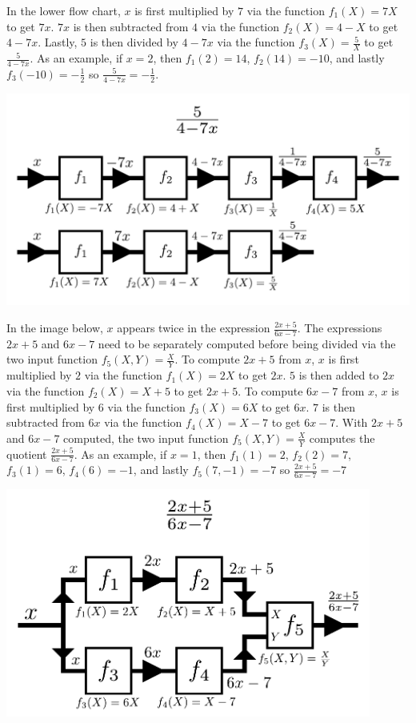 \documentclass{article}
\begin{document}
In the lower flow chart, \(x\) is first multiplied by \(7\) via the function \(f_1(X) = 7X\) to get \(7x\). \(7x\) is then subtracted from \(4\) via the function \(f_2(X) = 4 - X\) to get \(4 - 7x\). Lastly, \(5\) is then divided by \(4 - 7x\) via the function \(f_3(X) = \frac{5}{X}\) to get \(\frac{5}{4 - 7x}\). As an example, if \(x = 2\), then \(f_1(2) = 14\), \(f_2(14) = -10\), and lastly \(f_3(-10) = -\frac{1}{2}\) so \(\frac{5}{4 - 7x} = -\frac{1}{2}\). 

\includegraphics[width = \textwidth]{expressions_using_functions_1}

In the image below, \(x\) appears twice in the expression \(\frac{2x + 5}{6x - 7}\). The expressions \(2x + 5\) and \(6x - 7\) need to be separately computed before being divided via the two input function \(f_5(X, Y) = \frac{X}{Y}\). To compute \(2x + 5\) from \(x\), \(x\) is first multiplied by \(2\) via the function \(f_1(X) = 2X\) to get \(2x\). \(5\) is then added to \(2x\) via the function \(f_2(X) = X + 5\) to get \(2x + 5\). To compute \(6x - 7\) from \(x\), \(x\) is first multiplied by \(6\) via the function \(f_3(X) = 6X\) to get \(6x\). \(7\) is then subtracted from \(6x\) via the function \(f_4(X) = X - 7\) to get \(6x - 7\). With \(2x + 5\) and \(6x - 7\) computed, the two input function \(f_5(X, Y) = \frac{X}{Y}\) computes the quotient \(\frac{2x + 5}{6x - 7}\). As an example, if \(x = 1\), then \(f_1(1) = 2\), \(f_2(2) = 7\), \(f_3(1) = 6\), \(f_4(6) = -1\), and lastly \(f_5(7,-1) = -7\) so \(\frac{2x + 5}{6x - 7} = -7\)

\includegraphics[width = 0.9\textwidth]{expressions_using_functions_2}
\end{document}
